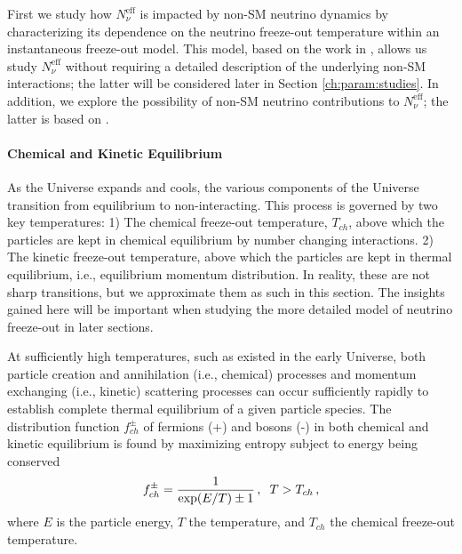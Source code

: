 First we study how $N^{\text{eff}}_{\nu}$ is impacted by non-SM neutrino dynamics by characterizing its dependence on the neutrino freeze-out temperature within an instantaneous freeze-out model.  This model, based on the work in \cite{Birrell:2013gpa,Birrell:2012gg}, allows us study $N^{\text{eff}}_{\nu}$ without  requiring a detailed description of the underlying  non-SM interactions; the latter will be considered later in Section \ref{ch:param:studies}.   In addition,   we explore the possibility of non-SM neutrino contributions to $N^{\text{eff}}_\nu$; the latter is based on \cite{Birrell:2014cja}.


\paragraph{Chemical and Kinetic Equilibrium }%

As the Universe expands and cools, the various components of the Universe transition  from equilibrium to non-interacting. This process is governed by two key temperatures: 1) The chemical freeze-out temperature, $T_{ch}$, above which the particles are kept in chemical  equilibrium by number changing interactions. 2) The  kinetic freeze-out temperature, above which the particles are kept in thermal equilibrium, i.e., equilibrium momentum distribution.  In reality, these are not sharp transitions, but we approximate them as such in this section.  The insights gained here will be important when studying the more detailed model of neutrino freeze-out in later sections.

At sufficiently high temperatures, such as existed in the early Universe, both particle creation and annihilation (i.e., chemical) processes and momentum exchanging (i.e., kinetic) scattering processes can occur sufficiently rapidly to establish complete thermal equilibrium of a given particle species. The  distribution function $f_{ch}^\pm$ of  fermions (+) and bosons (-) in both chemical and kinetic equilibrium is found by maximizing entropy subject to energy being conserved
\begin{equation}\label{ch_eq}
f_{ch}^\pm=\frac{1}{\exp(E/T)\pm 1}\,, \hspace{2mm} T>T_{ch}\,,
\end{equation}
where $E$ is the particle energy, $T$ the temperature, and $T_{ch}$ the chemical freeze-out temperature. 

